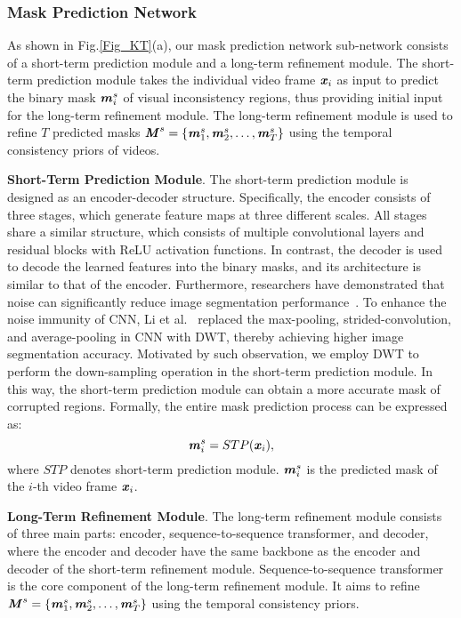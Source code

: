 \subsubsection{Mask Prediction Network}
As shown in Fig.\ref{Fig_KT}(a), 
our mask prediction network sub-network consists of a short-term prediction module and a long-term refinement module.
The short-term prediction module takes the individual video frame $\textbf{\emph{x}}_i$ as input to predict the binary mask $\textbf{\emph{m}}_i^s$ of visual inconsistency regions, thus providing initial input for the long-term refinement module.
The long-term refinement module is used to refine $T$ predicted masks
$\textbf{\emph{M}}^s = \{\textbf{\emph{m}}_1^s, \textbf{\emph{m}}_2^s, \dots, \textbf{\emph{m}}_T^s\}$
using the temporal consistency priors of videos.

\noindent\textbf{Short-Term Prediction Module}.
The short-term prediction module is designed as an encoder-decoder structure. 
Specifically, the encoder consists of three stages, which generate feature maps at three different scales.
All stages share a similar structure, which consists of multiple convolutional layers and residual blocks with ReLU activation functions. 
In contrast, the decoder is used to decode the learned features into the binary masks, and its architecture is similar to that of the encoder.
Furthermore, researchers have demonstrated that noise can significantly reduce image segmentation performance~\cite{9156335,9508165}. To enhance the noise immunity of CNN, Li et al.~\cite{9156335,9508165} replaced the max-pooling, strided-convolution, and average-pooling in CNN with DWT, thereby achieving higher image segmentation accuracy. 
Motivated by such observation, we employ DWT to perform the down-sampling operation in the short-term prediction module. 
In this way, the short-term prediction module can obtain a more accurate mask of corrupted regions.
Formally, the entire mask prediction process can be expressed as:
\begin{equation}
\textbf{\emph{m}}_i^s=STP(\textbf{\emph{x}}_i),
\label{STPM}
\end{equation}
where 
$STP$ denotes short-term prediction module.
$\textbf{\emph{m}}_i^s$ is the predicted mask of the $i$-th video frame $\textbf{\emph{x}}_i$.

\noindent\textbf{Long-Term Refinement Module}.
The long-term refinement module consists of three main parts: encoder, sequence-to-sequence transformer, and decoder, 
where the encoder and decoder have the same backbone as the encoder and decoder of the short-term refinement module.
Sequence-to-sequence transformer is the core component of the long-term refinement module. 
It aims to refine $\textbf{\emph{M}}^s = \{\textbf{\emph{m}}_1^s, \textbf{\emph{m}}_2^s, \dots, \textbf{\emph{m}}_T^s\}$ using the temporal consistency priors.



